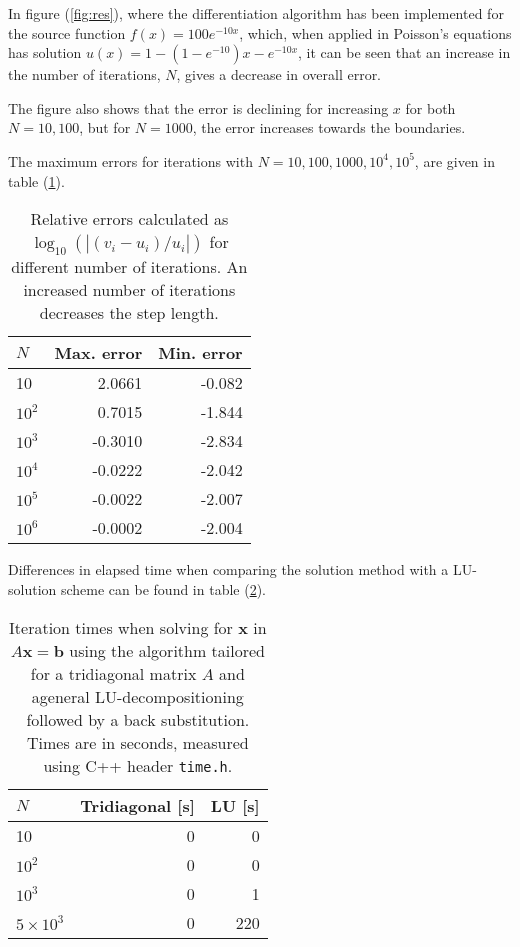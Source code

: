 \documentclass[a4paper,11pt]{article}
\begin{document}
    In figure (\ref{fig:res}), where the differentiation algorithm has been implemented for the source function $f(x) = 100 e^{-10x}$, which, when applied in Poisson's equations has solution $u(x) = 1-\left( 1-e^{-10} \right)x - e^{-10x}$, it can be seen that an increase in the number of iterations, $N$, gives a decrease in overall error. 

    The figure also shows that the error is declining for increasing $x$ for both $N=10,100$, but for $N=1000$, the error increases towards the boundaries. 

    The maximum errors for iterations with $N=10,100,1000,10^4,10^5$, are given in table (\ref{tab:errors}).

    \begin{table}
        \centering
        \begin{tabular}{l r r}
            $N$ & \textbf{Max. error}    & \textbf{Min. error} \\
            \hline
            10      &  2.0661   & -0.082 \\
            $10^2$  &  0.7015   & -1.844 \\
            $10^3$  & -0.3010   & -2.834 \\
            $10^4$  & -0.0222   & -2.042 \\
            $10^5$  & -0.0022   & -2.007 \\
            $10^6$  & -0.0002   & -2.004 \\
            \hline
        \end{tabular}
        \caption{Relative errors calculated as $\log_{10}\left( |(v_i - u_i)/u_i | \right)$ for different number of iterations. An increased number of iterations decreases the step length. }
        \label{tab:errors}
    \end{table}

    Differences in elapsed time when comparing the solution method with a LU-solution scheme can be found in table (\ref{tab:times}).

    \begin{table}
        \centering
        \begin{tabular}{l r r}
            $N$ & \textbf{Tridiagonal} [s]  & \textbf{LU} [s] \\
            \hline
            10      & 0 & 0 \\
            $10^2$  & 0 & 0 \\
            $10^3$  & 0 & 1 \\
            $5\times10^3$  & 0 & 220 \\
            \hline
        \end{tabular}
        \caption{Iteration times when solving for $\mathbf{x}$ in $A\mathbf{x} = \mathbf{b}$ using the algorithm tailored for a tridiagonal matrix $A$ and ageneral LU-decompositioning followed by a back substitution. Times are in seconds, measured using C++ header \texttt{time.h}.}
        \label{tab:times}
    \end{table}
\end{document}
